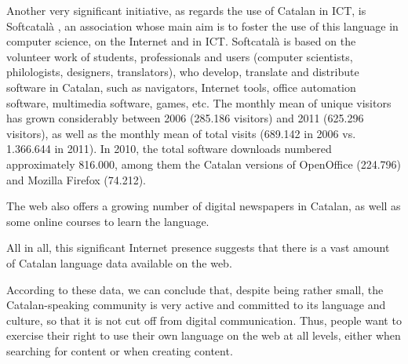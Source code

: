 \begin{multicols}{2}
Another very significant initiative, as regards the use of Catalan in ICT, is Softcatalà \cite{CAT-Nota21}, an association whose main aim is to foster the use of this language in computer science, on the Internet and in ICT. Softcatalà is based on the volunteer work of students, professionals and users (computer scientists, philologists, designers, translators), who develop, translate and distribute software in Catalan, such as navigators, Internet tools, office automation software, multimedia software, games, etc. The monthly mean of unique visitors has grown considerably between 2006 (285.186 visitors) and 2011 (625.296 visitors), as well as the monthly mean of total visits (689.142 in 2006 vs. 1.366.644 in 2011). In 2010, the total software downloads numbered approximately 816.000, among them the Catalan versions of OpenOffice (224.796) and Mozilla Firefox (74.212).

The web also offers a growing number of digital newspapers in Catalan, as well as some online courses to learn the language. 

All in all, this significant Internet presence suggests that there is a vast amount of Catalan language data available on the web. 

According to these data, we can conclude that, despite being rather small, the Catalan-speaking community is very active and committed to its language and culture, so that it is not cut off from digital communication. Thus, people want to exercise their right to use their own language on the web at all levels, either when searching for content or when creating content. 
\end{multicols}

\clearpage



